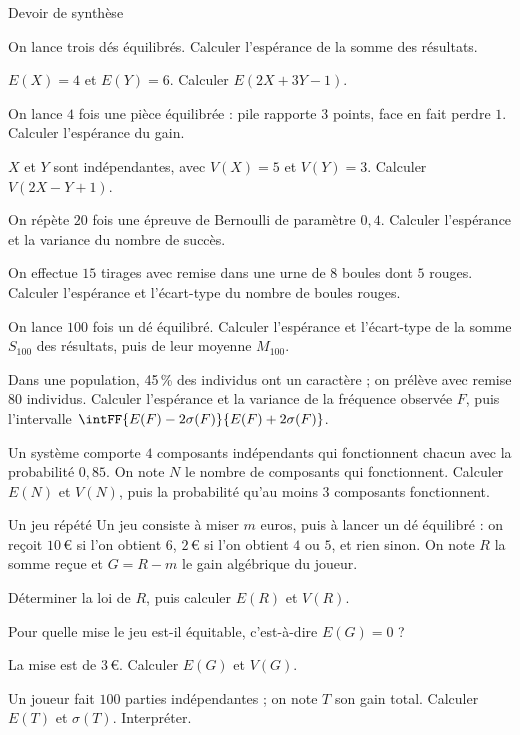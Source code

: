 \begin{exercice}[3]{Devoir de synthèse}
\begin{questions}
  \item On lance trois dés équilibrés. Calculer l'espérance de la somme des résultats.
  \item $E(X)=4$ et $E(Y)=6$. Calculer $E(2X+3Y-1)$.
  \item On lance $4$ fois une pièce équilibrée : pile rapporte $3$ points, face en fait perdre $1$. Calculer l'espérance du gain.
  \item $X$ et $Y$ sont indépendantes, avec $V(X)=5$ et $V(Y)=3$. Calculer $V(2X-Y+1)$.
  \item On répète $20$ fois une épreuve de Bernoulli de paramètre $0{,}4$. Calculer l'espérance et la variance du nombre de succès.
  \item On effectue $15$ tirages avec remise dans une urne de $8$ boules dont $5$ rouges. Calculer l'espérance et l'écart-type du
    nombre de boules rouges.
  \item On lance $100$ fois un dé équilibré. Calculer l'espérance et l'écart-type de la somme $S_{100}$ des résultats, puis de leur
    moyenne $M_{100}$.
  \item Dans une population, 45\,\% des individus ont un caractère ; on prélève avec remise $80$ individus. Calculer l'espérance et la
    variance de la fréquence observée $F$, puis l'intervalle $\intFF{E(F)-2\sigma(F)}{E(F)+2\sigma(F)}$.
  \item Un système comporte $4$ composants indépendants qui fonctionnent chacun avec la probabilité $0{,}85$. On note $N$ le nombre de
    composants qui fonctionnent. Calculer $E(N)$ et $V(N)$, puis la probabilité qu'au moins $3$ composants fonctionnent.
\end{questions}
\end{exercice}

\begin{exercice}[3]{Un jeu répété}
Un jeu consiste à miser $m$ euros, puis à lancer un dé équilibré : on reçoit $10$\,€ si l'on obtient $6$, $2$\,€ si l'on obtient $4$
ou $5$, et rien sinon. On note $R$ la somme reçue et $G=R-m$ le gain algébrique du joueur.
\begin{questions}
  \item Déterminer la loi de $R$, puis calculer $E(R)$ et $V(R)$.
  \item Pour quelle mise le jeu est-il équitable, c'est-à-dire $E(G)=0$ ?
  \item La mise est de $3$\,€. Calculer $E(G)$ et $V(G)$.
  \item Un joueur fait $100$ parties indépendantes ; on note $T$ son gain total. Calculer $E(T)$ et $\sigma(T)$. Interpréter.
\end{questions}
\end{exercice}

